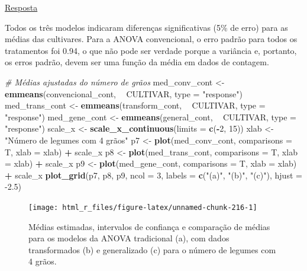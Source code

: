 \documentclass[
]{book}
\newenvironment{Shaded}{\begin{snugshade}}{\end{snugshade}}
\newcommand{\CommentTok}[1]{\textcolor[rgb]{0.56,0.35,0.01}{\textit{#1}}}
\newcommand{\DataTypeTok}[1]{\textcolor[rgb]{0.13,0.29,0.53}{#1}}
\newcommand{\DecValTok}[1]{\textcolor[rgb]{0.00,0.00,0.81}{#1}}
\newcommand{\FloatTok}[1]{\textcolor[rgb]{0.00,0.00,0.81}{#1}}
\newcommand{\KeywordTok}[1]{\textcolor[rgb]{0.13,0.29,0.53}{\textbf{#1}}}
\newcommand{\NormalTok}[1]{#1}
\newcommand{\OperatorTok}[1]{\textcolor[rgb]{0.81,0.36,0.00}{\textbf{#1}}}
\newcommand{\StringTok}[1]{\textcolor[rgb]{0.31,0.60,0.02}{#1}}
\begin{document}
\protect\hyperlink{exerc10}{Resposta}

Todos os três modelos indicaram diferenças significativas (5\% de erro) para as médias das cultivares. Para a ANOVA convencional, o erro padrão para todos os tratamentos foi 0.94, o que não pode ser verdade porque a variância e, portanto, os erros padrão, devem ser uma função da média em dados de contagem.

\begin{Shaded}
\begin{Highlighting}[]

\CommentTok{# Médias ajustadas do número de grãos}
\NormalTok{med_conv_cont <-}\StringTok{ }\KeywordTok{emmeans}\NormalTok{(convencional_cont, }\OperatorTok{~}\StringTok{ }\NormalTok{CULTIVAR, }\DataTypeTok{type =} \StringTok{"response"}\NormalTok{)}
\NormalTok{med_trans_cont <-}\StringTok{ }\KeywordTok{emmeans}\NormalTok{(transform_cont, }\OperatorTok{~}\StringTok{ }\NormalTok{CULTIVAR, }\DataTypeTok{type =} \StringTok{"response"}\NormalTok{)}
\NormalTok{med_gene_cont <-}\StringTok{ }\KeywordTok{emmeans}\NormalTok{(general_cont, }\OperatorTok{~}\StringTok{ }\NormalTok{CULTIVAR, }\DataTypeTok{type =} \StringTok{"response"}\NormalTok{)}
\NormalTok{scale_x <-}\StringTok{ }\KeywordTok{scale_x_continuous}\NormalTok{(}\DataTypeTok{limits =} \KeywordTok{c}\NormalTok{(}\OperatorTok{-}\DecValTok{2}\NormalTok{, }\DecValTok{15}\NormalTok{))}
\NormalTok{xlab <-}\StringTok{ "Número de legumes com 4 grãos"}
\NormalTok{p7 <-}\StringTok{ }\KeywordTok{plot}\NormalTok{(med_conv_cont, }\DataTypeTok{comparisons =}\NormalTok{ T, }\DataTypeTok{xlab =}\NormalTok{ xlab) }\OperatorTok{+}\StringTok{ }\NormalTok{scale_x}
\NormalTok{p8 <-}\StringTok{ }\KeywordTok{plot}\NormalTok{(med_trans_cont, }\DataTypeTok{comparisons =}\NormalTok{ T, }\DataTypeTok{xlab =}\NormalTok{ xlab) }\OperatorTok{+}\StringTok{ }\NormalTok{scale_x}
\NormalTok{p9 <-}\StringTok{ }\KeywordTok{plot}\NormalTok{(med_gene_cont, }\DataTypeTok{comparisons =}\NormalTok{ T, }\DataTypeTok{xlab =}\NormalTok{ xlab) }\OperatorTok{+}\StringTok{ }\NormalTok{scale_x}
\KeywordTok{plot_grid}\NormalTok{(p7, p8, p9, }\DataTypeTok{ncol =} \DecValTok{3}\NormalTok{, }
          \DataTypeTok{labels =} \KeywordTok{c}\NormalTok{(}\StringTok{"(a)"}\NormalTok{, }\StringTok{"(b)"}\NormalTok{, }\StringTok{"(c)"}\NormalTok{),}
          \DataTypeTok{hjust =} \FloatTok{-2.5}\NormalTok{)}
\end{Highlighting}
\end{Shaded}

\begin{figure}

{\centering \texttt{[image: html\_r\_files/figure-latex/unnamed-chunk-216-1]} 

}

\caption{Médias estimadas, intervalos de confiança e comparação de médias para os modelos da ANOVA tradicional (a), com dados transformados (b) e generalizado (c) para o número de legumes com 4 grãos.}\label{fig:unnamed-chunk-216}
\end{figure}
\end{document}
